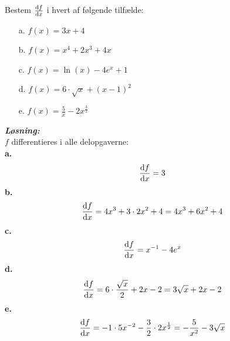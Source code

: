 \documentclass{article}
\newcommand{\sol}{\setlength{\parindent}{0cm}\textbf{\textit{Løsning:}}\setlength{\parindent}{1cm}}
\begin{document}
\begin{question}{}{}
  Bestem $\dv{f}{x}$ i hvert af følgende tilfælde:
\begin{itemize}
  \item[a.] $f(x)=3x+4$
  \item[b.] $f(x)=x^4+2x^3+4x$
  \item[c.] $f(x)=\ln(x)-4e^x+1$
  \item[d.] $f(x)=6\cdot \sqrt{x} + (x-1)^2$
  \item[e.] $f(x)=\frac{5}{x}-2x^{\frac{3}{2}}$
\end{itemize}
\end{question}
\sol \\ 
$f$ differentieres i alle delopgaverne:\\ 
\textbf{a.} 
\[
\dv{f}{x}=3
\] 
\textbf{b.}
\[
\dv{f}{x}=4x^3+3\cdot 2x^2+4=4x^3+6x^2+4
\] 
\textbf{c.}
\[
\dv{f}{x}=x^{-1} - 4e^x
\] 
\textbf{d.}
\[
\dv{f}{x}= 6\cdot \frac{\sqrt{x} }{2}+2x-2=3 \sqrt{x} +2x-2
\] 
\textbf{e.}
\[
\dv{f}{x} = -1\cdot 5x^{-2}-\frac{3}{2}\cdot 2x^{\frac{1}{2}}=- \frac{5}{x^2} - 3 \sqrt{x} 
\] 
\end{document}
